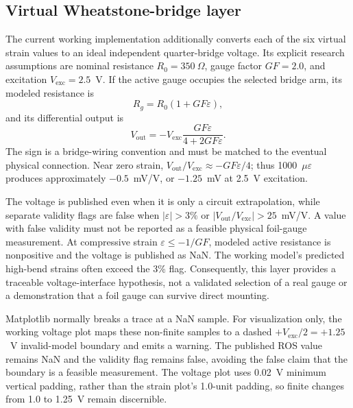 \documentclass[11pt,letterpaper]{article}
\newcommand{\microstrain}{\ensuremath{\mu\varepsilon}}
\begin{document}
\subsection{Virtual Wheatstone-bridge layer}
The current working implementation additionally converts each of the six
virtual strain values to an ideal independent quarter-bridge voltage. Its
explicit research assumptions are nominal resistance $R_0=350~\Omega$, gauge
factor $GF=2.0$, and excitation $V_{\mathrm{exc}}=2.5$~V. If the active gauge
occupies the selected bridge arm, its modeled resistance is
\begin{equation}
R_g=R_0(1+GF\varepsilon),
\end{equation}
and its differential output is
\begin{equation}
V_{\mathrm{out}}=-V_{\mathrm{exc}}
\frac{GF\varepsilon}{4+2GF\varepsilon}.
\label{eq:bridge}
\end{equation}
The sign is a bridge-wiring convention and must be matched to the eventual
physical connection. Near zero strain, $V_{\mathrm{out}}/V_{\mathrm{exc}}
\approx-GF\varepsilon/4$; thus 1000~\microstrain{} produces approximately
$-0.5$~mV/V, or $-1.25$~mV at 2.5~V excitation.

The voltage is published even when it is only a circuit extrapolation, while
separate validity flags are false when $|\varepsilon|>3\%$ or
$|V_{\mathrm{out}}/V_{\mathrm{exc}}|>25$~mV/V. A value with false validity
must not be reported as a feasible physical foil-gauge measurement. At
compressive strain $\varepsilon\leq-1/GF$, modeled active resistance is
nonpositive and the voltage is published as NaN. The working model's predicted
high-bend strains often exceed the 3\% flag. Consequently, this layer provides
a traceable voltage-interface hypothesis, not a validated selection of a real
gauge or a demonstration that a foil gauge can survive direct mounting.

Matplotlib normally breaks a trace at a NaN sample. For visualization only,
the working voltage plot maps these non-finite samples to a dashed
$+V_{\mathrm{exc}}/2=+1.25$~V invalid-model boundary and emits a warning. The
published ROS value remains NaN and the validity flag remains false, avoiding
the false claim that the boundary is a feasible measurement. The voltage plot
uses 0.02~V minimum vertical padding, rather than the strain plot's 1.0-unit
padding, so finite changes from 1.0 to 1.25~V remain discernible.
\end{document}
